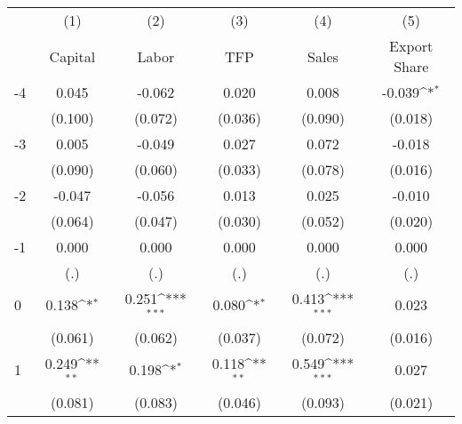{
\def\sym#1{\ifmmode^{#1}\else\(^{#1}\)\fi}
\begin{tabular}{l*{5}{c}}
\hline\hline
                    &\multicolumn{1}{c}{(1)}&\multicolumn{1}{c}{(2)}&\multicolumn{1}{c}{(3)}&\multicolumn{1}{c}{(4)}&\multicolumn{1}{c}{(5)}\\
                    &\multicolumn{1}{c}{Capital}&\multicolumn{1}{c}{Labor}&\multicolumn{1}{c}{TFP}&\multicolumn{1}{c}{Sales}&\multicolumn{1}{c}{Export Share}\\
\hline
-4                  &       0.045         &      -0.062         &       0.020         &       0.008         &      -0.039\sym{*}  \\
                    &     (0.100)         &     (0.072)         &     (0.036)         &     (0.090)         &     (0.018)         \\
[1em]
-3                  &       0.005         &      -0.049         &       0.027         &       0.072         &      -0.018         \\
                    &     (0.090)         &     (0.060)         &     (0.033)         &     (0.078)         &     (0.016)         \\
[1em]
-2                  &      -0.047         &      -0.056         &       0.013         &       0.025         &      -0.010         \\
                    &     (0.064)         &     (0.047)         &     (0.030)         &     (0.052)         &     (0.020)         \\
[1em]
-1                  &       0.000         &       0.000         &       0.000         &       0.000         &       0.000         \\
                    &         (.)         &         (.)         &         (.)         &         (.)         &         (.)         \\
[1em]
0                   &       0.138\sym{*}  &       0.251\sym{***}&       0.080\sym{*}  &       0.413\sym{***}&       0.023         \\
                    &     (0.061)         &     (0.062)         &     (0.037)         &     (0.072)         &     (0.016)         \\
[1em]
1                   &       0.249\sym{**} &       0.198\sym{*}  &       0.118\sym{**} &       0.549\sym{***}&       0.027         \\
                    &     (0.081)         &     (0.083)         &     (0.046)         &     (0.093)         &     (0.021)         \\

\end{tabular}}
